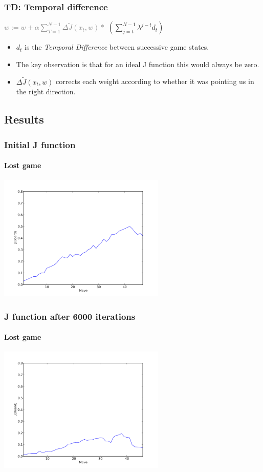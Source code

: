 \documentclass[10pt]{beamer}
\begin{document}
    \begin{frame}
      \frametitle{TD: Temporal difference}
      \begin{center} \textcolor{gray}{$\displaystyle w := w + \alpha \sum_{T=1}^{N-1} \Delta \tilde{J}(x_t,w) *$}  $( \sum _{j=t} ^{N-1} \lambda ^{j-t} d_t )$ \end{center}
      \begin{itemize}
        \item<1-> $d_t$ is the \emph{Temporal Difference} between successive game states.
        \item<1-> The key observation is that for an ideal J function this would always be zero.
        \item<1-> $\Delta \tilde{J}(x_t,w)$ corrects each weight according to whether it was pointing us in the right direction.
      \end{itemize}
    \end{frame}

\subsection{Results}



\begin{frame}
  \frametitle{Initial J function}
  \framesubtitle{Lost game}
  \begin{center} \includegraphics[height=6cm]{Graphs/J_1iteration_lost.pdf} \end{center}
\end{frame}

\begin{frame}
  \frametitle{J function after 6000 iterations}
  \framesubtitle{Lost game}
  \begin{center} \includegraphics[height=6cm]{Graphs/J_6000iterations_lost.pdf} \end{center}
\end{frame}
\end{document}

